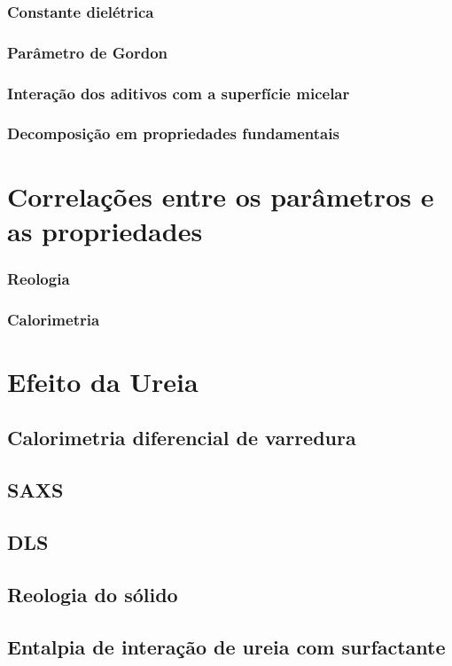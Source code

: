 \documentclass[a4paper, 10pt]{book}
\begin{document}
		\subsection{Constante dielétrica}
		\subsection{Parâmetro de Gordon}
		\subsection{Interação dos aditivos com a superfície micelar}
		\subsection{Decomposição em propriedades fundamentais}
	\chapter{Correlações entre os parâmetros e as propriedades}
		\subsection{Reologia}
		\subsection{Calorimetria}
	\chapter{Efeito da Ureia}
		\section{Calorimetria diferencial de varredura}
		\section{SAXS}
		\section{DLS}
		\section{Reologia do sólido}
		\section{Entalpia de interação de ureia com surfactante}
	
\end{document}
